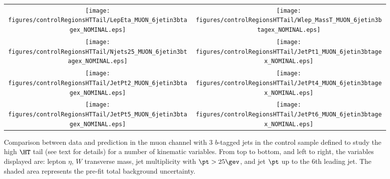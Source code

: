 \begin{figure}[htbp]
\begin{center}
\begin{tabular}{cc}
%
\texttt{[image: figures/controlRegionsHTTail/LepEta\_MUON\_6jetin3btagex\_NOMINAL.eps]} &
\texttt{[image: figures/controlRegionsHTTail/Wlep\_MassT\_MUON\_6jetin3btagex\_NOMINAL.eps]} \\
\texttt{[image: figures/controlRegionsHTTail/Njets25\_MUON\_6jetin3btagex\_NOMINAL.eps]} &
\texttt{[image: figures/controlRegionsHTTail/JetPt1\_MUON\_6jetin3btagex\_NOMINAL.eps]} \\
\texttt{[image: figures/controlRegionsHTTail/JetPt2\_MUON\_6jetin3btagex\_NOMINAL.eps]} &
\texttt{[image: figures/controlRegionsHTTail/JetPt4\_MUON\_6jetin3btagex\_NOMINAL.eps]} \\
\texttt{[image: figures/controlRegionsHTTail/JetPt5\_MUON\_6jetin3btagex\_NOMINAL.eps]} &
\texttt{[image: figures/controlRegionsHTTail/JetPt6\_MUON\_6jetin3btagex\_NOMINAL.eps]} \\
\end{tabular}\caption{\small {Comparison between data and prediction in the muon channel with 3 $b$-tagged jets in the control sample
defined to study the high $\HT$ tail (see text for details)  for a number of kinematic
variables. From top to bottom, and left to right, the variables displayed are: lepton $\eta$, $W$ transverse mass, jet multiplicity with $\pt>25\gev$, 
and jet $\pt$ up to the 6th leading jet.
The shaded area represents the pre-fit total background uncertainty.}}
\label{fig:MUON_controlHTTail_3btagex_2}
\end{center}
\end{figure}
